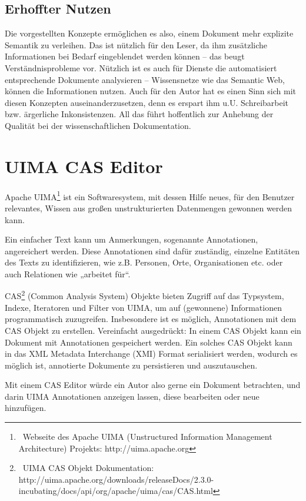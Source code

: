 \subsection{Erhoffter Nutzen}\label{}
 
Die vorgestellten Konzepte ermöglichen es also, einem Dokument mehr explizite Semantik zu verleihen. Das ist nützlich für den Leser, da ihm zusätzliche Informationen bei Bedarf eingeblendet werden können -- das beugt Verständnisprobleme vor. Nützlich ist es auch für Dienste die automatisiert entsprechende Dokumente analysieren -- Wissensnetze wie das Semantic Web, können die Informationen nutzen. Auch für den Autor hat es einen Sinn sich mit diesen Konzepten auseinanderzusetzen, denn es erspart ihm u.U. Schreibarbeit bzw. ärgerliche Inkonsistenzen. All das führt hoffentlich zur Anhebung der Qualität bei der wissenschaftlichen Dokumentation.

 
\section{UIMA CAS Editor}\label{uima-cas-kapitel}
 
Apache UIMA\footnote{~Webseite des Apache UIMA (Unstructured Information Management Architecture) Projekts: http://uima.apache.org } ist ein Softwaresystem, mit dessen Hilfe neues, für den Benutzer relevantes, Wissen aus großen unstrukturierten Datenmengen gewonnen werden kann.

 
Ein einfacher Text kann um Anmerkungen, sogenannte Annotationen, angereichert werden. Diese Annotationen sind dafür zuständig, einzelne Entitäten des Texts zu identifizieren, wie z.B. Personen, Orte, Organisationen etc. oder auch Relationen wie „arbeitet für“.

 
CAS\footnote{~UIMA CAS Objekt Dokumentation: http://uima.apache.org/downloads/releaseDocs/2.3.0-incubating/docs/api/org/apache/uima/cas/CAS.html} (Common Analysis System) Objekte bieten Zugriff auf das Typsystem, Indexe, Iteratoren und Filter von UIMA, um auf (gewonnene) Informationen programmatisch zuzugreifen. Insbesondere ist es möglich, Annotationen mit dem CAS Objekt zu erstellen. Vereinfacht ausgedrückt: In einem CAS Objekt kann ein Dokument mit Annotationen gespeichert werden. Ein solches CAS Objekt kann in das XML Metadata Interchange (XMI) Format serialisiert werden, wodurch es möglich ist, annotierte Dokumente zu persistieren und auszutauschen.

 
Mit einem CAS Editor würde ein Autor also gerne ein Dokument betrachten, und darin UIMA Annotationen anzeigen lassen, diese bearbeiten oder neue hinzufügen.

